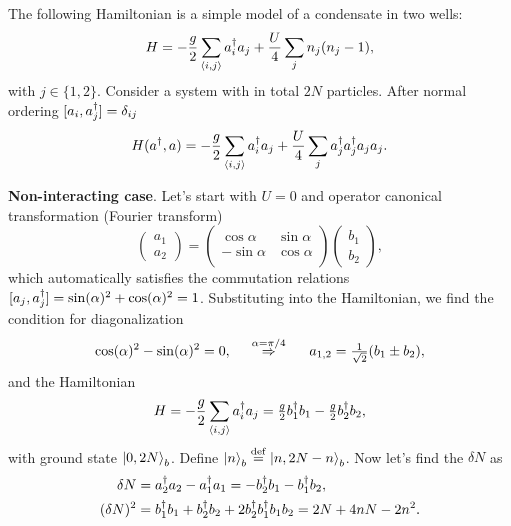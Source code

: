The following Hamiltonian is a simple model of a condensate in two wells:
\begin{equation}
	H = - \frac{g}{2} \sum_{\langle i,j\rangle} a_i^{\dag} a_j + \frac{U}{4} \sum_{j} n_j (n_j-1),
\end{equation}
with $j \in \{1,2\}$. Consider a system with in total $2N$ particles. After normal ordering $[a_i, a_j^{\dag}]=\delta_{ij}$
\begin{equation*}
	H(a^{\dag}, a) = - \frac{g}{2} \sum_{\langle i,j\rangle} a_i^{\dag} a_j  + \frac{U}{4} \sum_{j} a_j^{\dag} a_j^{\dag} a_j a_j.
\end{equation*}


\textbf{Non-interacting case}. Let's start with $U=0$ and operator canonical transformation (Fourier transform)
\begin{equation*}
	\begin{pmatrix}
		a_1 \\ a_2
	\end{pmatrix} = \begin{pmatrix}
	    \cos \alpha & \sin \alpha \\
	    - \sin \alpha & \cos \alpha \\
	\end{pmatrix} 
	\begin{pmatrix}
		b_1 \\ b_2
	\end{pmatrix},
\end{equation*}
which automatically satisfies the commutation relations $[a_j, a_j^{\dag}] = \sin (\alpha)^2 + \cos (\alpha)^2 = 1$. Substituting into the Hamiltonian, we find the condition for diagonalization
\begin{equation*}
	\cos (\alpha)^2 - \sin(\alpha)^2 = 0,
	\hspace{0.5cm} \overset{\alpha=\pi/4}{\Rightarrow}  \hspace{0.5cm}
	a_{1,2} = \tfrac{1}{\sqrt{2}}(b_1 \pm b_2),
\end{equation*}
and the Hamiltonian
\begin{equation*}
	H = - \frac{g}{2} \sum_{\langle i,j\rangle} a_i^{\dag} a_j =  \tfrac{g}{2} b^{\dag}_1 b_1 - \tfrac{g}{2} b^{\dag}_2 b_2,
\end{equation*}
with ground state $\left| 0,2N \right\rangle_b$. Define $\left| n \right\rangle_b \overset{\mathrm{def}}{=} \left| n,2N-n \right\rangle_b$. Now let's find the $\delta N$ as
\begin{align*}
	\delta N &= a_2^{\dag} a_2 - a_1^{\dag} a_1 = - b_2^{\dag} b_1 - b_1^{\dag} b_2,\\
	(\delta N)^2 &= b_1^{\dag} b_1 + b_2^{\dag} b_2 + 2 b_2^{\dag} b_1^{\dag} b_1 b_2 = 2N + 4 nN - 2n^2.
\end{align*}
